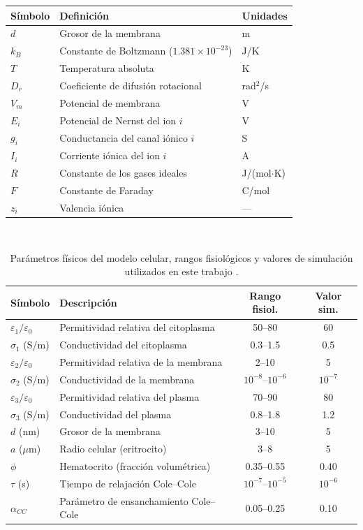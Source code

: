 \documentclass[12pt]{article}
\begin{document}
\begin{tabular}{@{}lll@{}}
\toprule
\textbf{S\'imbolo} & \textbf{Definici\'on} & \textbf{Unidades} \\
\midrule
$d$ & Grosor de la membrana & m \\
$k_B$ & Constante de Boltzmann ($1.381\times10^{-23}$) & J/K \\
$T$ & Temperatura absoluta & K \\
$D_r$ & Coeficiente de difusi\'on rotacional & rad$^2$/s \\
$V_m$ & Potencial de membrana & V \\
$E_i$ & Potencial de Nernst del ion $i$ & V \\
$g_i$ & Conductancia del canal i\'onico $i$ & S \\
$I_i$ & Corriente i\'onica del ion $i$ & A \\
$R$ & Constante de los gases ideales & J/(mol$\cdot$K) \\
$F$ & Constante de Faraday & C/mol \\
$z_i$ & Valencia i\'onica & --- \\
\bottomrule
\end{tabular}
\

\begin{table}[H]
\centering
\caption{Par\'ametros f\'isicos del modelo celular, rangos fisiol\'ogicos y valores de simulaci\'on utilizados en este trabajo \citep{Schwan1957, Asami2002}.}
\label{tab:params}
\renewcommand{\arraystretch}{1.35}
\begin{tabularx}{\textwidth}{@{}lXcc@{}}
\toprule
\textbf{S\'imbolo} & \textbf{Descripci\'on} & \textbf{Rango fisiol.}
& \textbf{Valor sim.} \\
\midrule
$\varepsilon_1/\varepsilon_0$ & Permitividad relativa del citoplasma
& 50--80 & 60 \\
$\sigma_1$ (S/m) & Conductividad del citoplasma
& 0.3--1.5 & 0.5 \\
$\varepsilon_2/\varepsilon_0$ & Permitividad relativa de la membrana
& 2--10 & 5 \\
$\sigma_2$ (S/m) & Conductividad de la membrana
& $10^{-8}$--$10^{-6}$ & $10^{-7}$ \\
$\varepsilon_3/\varepsilon_0$ & Permitividad relativa del plasma
& 70--90 & 80 \\
$\sigma_3$ (S/m) & Conductividad del plasma
& 0.8--1.8 & 1.2 \\
$d$ (nm) & Grosor de la membrana
& 3--10 & 5 \\
$a$ ($\mu$m) & Radio celular (eritrocito)
& 3--8 & 5 \\
$\phi$ & Hematocrito (fracci\'on volum\'etrica)
& 0.35--0.55 & 0.40 \\
$\tau$ (s) & Tiempo de relajaci\'on Cole--Cole
& $10^{-7}$--$10^{-5}$ & $10^{-6}$ \\
$\alpha_{CC}$ & Par\'ametro de ensanchamiento Cole--Cole

& 0.05--0.25 & 0.10 \\
\bottomrule
\end{tabularx}
\end{table}
\end{document}
